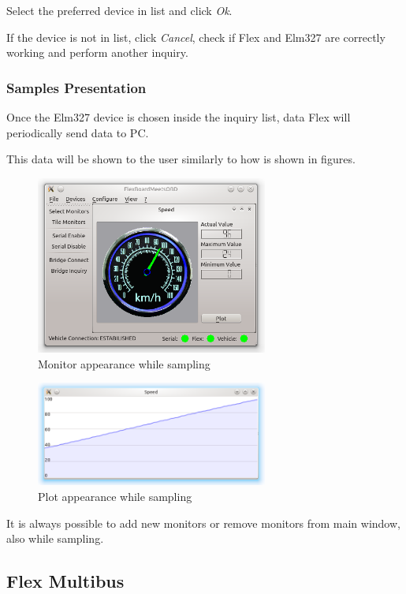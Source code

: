 \documentclass[twoside]{article}
\begin{document}
\begin{multicols}{2}
Select the preferred device in list and click \emph{Ok}.

If the device is not in list, click \emph{Cancel}, check if Flex and Elm327 are correctly working and perform another inquiry.

\subsubsection{Samples Presentation}

Once the Elm327 device is chosen inside the inquiry list, data Flex will periodically send data to PC.

This data will be shown to the user similarly to how is shown in figures.

\begin{figure}[H]
  \centering
  \includegraphics[width=3in]{img/GUI/sampling_monitor}
  \caption{Monitor appearance while sampling}
\end{figure}

\begin{figure}[H]
  \centering
  \includegraphics[width=3in]{img/GUI/sampling_plot}
  \caption{Plot appearance while sampling}
\end{figure}

It is always possible to add new monitors or remove monitors from main window, also while sampling.

\subsection{Flex Multibus}


\end{multicols}
\end{document}

